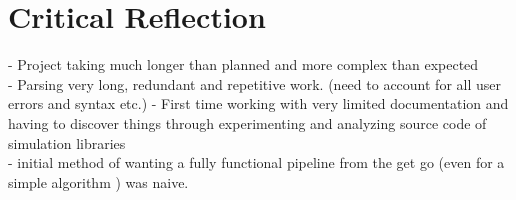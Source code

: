 \section{Critical Reflection}
\label{criticalreflection}

- Project taking much longer than planned and more complex than expected\\
- Parsing very long, redundant and repetitive work. (need to account for all user errors and syntax etc.)
- First time working with very limited documentation and having to discover things through experimenting and analyzing source code of simulation libraries \\ 
- initial method of wanting a fully functional pipeline from the get go (even for a simple algorithm ) was naive.


